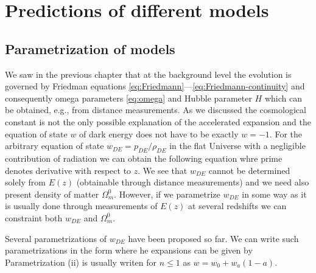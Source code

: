 \section{Predictions of different models}

\subsection{Parametrization of models}
We saw in the previous chapter that at the background level the evolution is governed by Friedman equations \eqref{eq:Friedmann}---\eqref{eq:Friedmann-continuity} and consequently omega parameters \eqref{eq:omega} and Hubble parameter $H$ which can be obtained, e.g., from distance measurements. As we discussed the cosmological constant is not the only possible explanation of the accelerated expansion and the equation of state \(w\) of dark energy does not have to be exactly \(w=-1\). For the arbitrary equation of state $w_{DE}=p_{DE}/\rho_{DE}$ in the flat Universe with a negligible contribution of radiation we can obtain the following equation
whre prime denotes derivative with respect to \(z\). We see that \(w_{DE}\) cannot be determined solely from \(E(z)\) (obtainable through distance measurements) and we need also present density of matter \(\Omega_m^0\). However, if we parametrize \(w_{DE}\) in some way as it is usually done through measurements of \(E(z)\) at several redshifts we can constraint both \(w_{DE}\) and \(\Omega_m^0\).

Several parametrizations of \(w_{DE}\) have been proposed so far. We can write such parametrizations in the form
where he expansions can be given by
Parametrization (ii) is usually writen for \(n\leq1\) as \(w=w_0+w_a(1-a)\).

